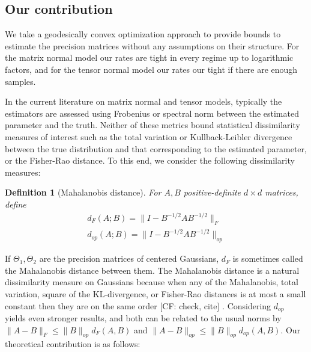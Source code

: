 \documentclass{article}
\newtheorem{definition}{Definition}
\newcommand{\CF}[1]{{\color{purple}[CF: #1]}}
\begin{document}
\subsection{Our contribution}

We take a geodesically convex optimization approach to provide bounds to estimate the precision matrices without any assumptions on their structure. For the matrix normal model our rates are tight in every regime up to logarithmic factors, and for the tensor normal model our rates our tight if there are enough samples.

In the current literature on matrix normal and tensor models, typically the estimators are assessed using Frobenius or spectral norm between the estimated parameter and the truth. Neither of these metrics bound statistical dissimilarity measures of interest such as the total variation or Kullback-Leibler divergence between the true distribution and that corresponding to the estimated parameter, or the Fisher-Rao distance. To this end, we consider the following dissimilarity measures:
\begin{definition}[Mahalanobis distance]
For $A,B$ positive-definite $d\times d$ matrices, define
\begin{align}d_{F}(A; B) = \| I - B^{-1/2} A B^{-1/2}\|_F\\
d_{op}(A; B) = \| I - B^{-1/2} A B^{-1/2}\|_{op}
\end{align}
\end{definition}
If $\Theta_1, \Theta_2$ are the precision matrices of centered Gaussians, $d_F$ is sometimes called the Mahalanobis distance between them. The Mahalanobis distance is a natural dissimilarity measure on Gaussians because when any of the Mahalanobis, total variation, square of the KL-divergence, or Fisher-Rao distances is at most a small constant then they are on the same order \CF{check, cite} \cite{barsov1987}. Considering $d_{op}$ yields even stronger results, and both can be related to the usual norms by $\|A - B\|_F \leq \|B\|_{op} d_F(A,B)$ and $\|A  - B\|_{op} \leq \|B\|_{op} d_{op}(A,B)$. Our theoretical contribution is as follows:
\end{document}

